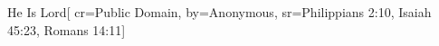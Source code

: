 {He Is Lord}[
    cr={Public Domain},
    by={Anonymous},
    sr={Philippians 2:10, Isaiah 45:23, Romans 14:11}]
